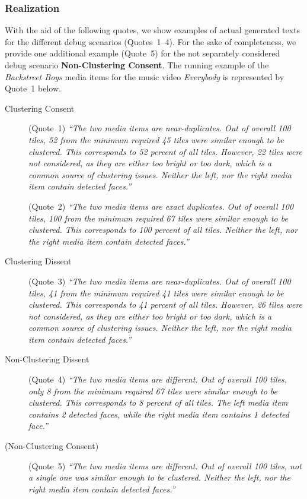\documentclass{article}
\begin{document}
\subsubsection{Realization}

With the aid of the following quotes,
we show examples of actual generated texts
for the different debug scenarios (Quotes~1--4). 
For the sake of completeness, we provide one additional example (Quote~5)
for the not separately considered debug scenario \textbf{Non-Clustering Consent}.
The running example of the \emph{Backstreet Boys} media items
for the music video \emph{Everybody} 
is represented by Quote~1 below.

\begin{description}
  \item[Clustering Consent]
      (Quote~1) \textit{``The two media items are near-duplicates.
      Out of overall 100 tiles, 52 from the minimum required 45 tiles
      were similar enough to be clustered.
      This corresponds to 52 percent of all tiles.
      However, 22 tiles were not considered,
      as they are either too bright or too dark,
      which is a common source of clustering issues.
      Neither the left, nor the right media item contain detected faces.''}
    
      (Quote~2) \textit{``The two media items are exact duplicates.
      Out of overall 100 tiles, 100 from the minimum required 67 tiles
      were similar enough to be clustered.
      This corresponds to 100 percent of all tiles.
      Neither the left, nor the right media item contain detected faces.''}
  \item[Clustering Dissent]    
      (Quote~3) \textit{``The two media items are near-duplicates.
      Out of overall 100 tiles, 41 from the minimum required 41 tiles were similar
      enough to be clustered.
      This corresponds to 41 percent of all tiles.
      However, 26 tiles were not considered, as they are either too bright
      or too dark, which is a common source of clustering issues.
      Neither the left, nor the right media item contain detected faces.''}    
  \item[Non-Clustering Dissent]    
      (Quote~4) \textit{``The two media items are different.
      Out of overall 100 tiles, only 8 from the minimum required 67 tiles
      were similar enough to be clustered.
      This corresponds to 8 percent of all tiles.
      The left media item contains 2 detected faces,
      while the right media item contains 1 detected face.''}
  \item[(Non-Clustering Consent)]    
      (Quote~5) \textit{``The two media items are different.
      Out of overall 100 tiles, not a single one was similar enough
      to be clustered.
      Neither the left, nor the right media item contain detected faces.''}
\end{description}
\end{document}
